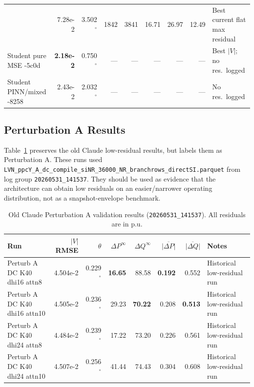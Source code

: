 \documentclass{article}
\begin{document}
\begin{table}[h]
\begin{tabular}{p{3.0cm}rrrrrrrp{2.0cm}}
  & 7.28e-2 & 3.502\ensuremath{^\circ} & 1842 & 3841
  & 16.71 & 26.97 & 12.49
  & Best current flat max residual \\[3pt]
\rowcolor{warnyellow}
Student pure MSE
  \newline\quad 260601-5c0d
  & \textbf{2.18e-2} & 0.750\ensuremath{^\circ} & --- & ---
  & --- & --- & ---
  & Best $|V|$; no res.\ logged \\[3pt]
\rowcolor{warnyellow}
Student PINN/mixed
  \newline\quad 260601-8258
  & 2.43e-2 & 2.032\ensuremath{^\circ} & --- & ---
  & --- & --- & ---
  & No res.\ logged \\
\bottomrule
\end{tabular}
\end{table}

\subsection{Perturbation A Results}

Table~\ref{tab:pertA} preserves the old Claude low-residual results, but
labels them as Perturbation A.  These runs used
\texttt{LVN\_ppcY\_A\_dc\_compile\_siNR\_36000\_NR\_branchrows\_directSI.parquet}
from log group \texttt{20260531\_141537}.  They should be used as evidence
that the architecture can obtain low residuals on an easier/narrower
operating distribution, not as a snapshot-envelope benchmark.

\begin{table}[h]
\centering
\caption{Old Claude Perturbation A validation results
  (\texttt{20260531\_141537}).  All residuals are in p.u.}
\label{tab:pertA}
\setlength{\tabcolsep}{4pt}
\small
\begin{tabular}{p{3.2cm}rrrrrrp{3.0cm}}
\toprule
Run & $|V|$ RMSE & $\theta$ & $\Delta P^\infty$ & $\Delta Q^\infty$
    & $\overline{|\Delta P|}$ & $\overline{|\Delta Q|}$ & Notes \\
\midrule
\rowcolor{bestgreen}
Perturb A DC K40 dhi16 attn8
  & 4.504e-2 & 0.229\ensuremath{^\circ} & \textbf{16.65} & 88.58
  & \textbf{0.192} & 0.552
  & Historical low-residual run \\
Perturb A DC K40 dhi16 attn10
  & 4.505e-2 & 0.236\ensuremath{^\circ} & 29.23 & \textbf{70.22}
  & 0.208 & \textbf{0.513}
  & Historical low-residual run \\
Perturb A DC K40 dhi24 attn8
  & 4.484e-2 & 0.239\ensuremath{^\circ} & 17.22 & 73.20
  & 0.226 & 0.561
  & Historical low-residual run \\
Perturb A DC K40 dhi24 attn10
  & 4.507e-2 & 0.256\ensuremath{^\circ} & 41.44 & 74.43
  & 0.304 & 0.608
  & Historical low-residual run \\
\bottomrule
\end{tabular}
\end{table}
\end{document}
